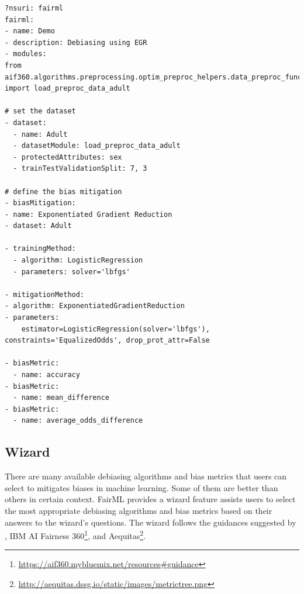 \documentclass[sigconf,review]{acmart}
\begin{document}
\begin{lstlisting}[firstnumber=1,style=yaml,caption={Bias mitigation using  Demo Exponentiated Gradient Reduction  expressed in YAML.},label=lst:fairml_model]
?nsuri: fairml
fairml:
- name: Demo
- description: Debiasing using EGR
- modules: 
from aif360.algorithms.preprocessing.optim_preproc_helpers.data_preproc_functions import load_preproc_data_adult

# set the dataset
- dataset:
  - name: Adult
  - datasetModule: load_preproc_data_adult
  - protectedAttributes: sex
  - trainTestValidationSplit: 7, 3

# define the bias mitigation
- biasMitigation:
- name: Exponentiated Gradient Reduction  
- dataset: Adult

- trainingMethod:
  - algorithm: LogisticRegression
  - parameters: solver='lbfgs'

- mitigationMethod:
- algorithm: ExponentiatedGradientReduction
- parameters: 
    estimator=LogisticRegression(solver='lbfgs'), constraints='EqualizedOdds', drop_prot_attr=False

- biasMetric:
  - name: accuracy
- biasMetric:
  - name: mean_difference
- biasMetric:
  - name: average_odds_difference
\end{lstlisting}


\subsection{Wizard}
\label{sec:wizard}
There are many available debiasing algorithms and bias metrics that users can select to mitigates biases in machine learning. Some of them are better than others in certain context. FairML provides a wizard feature assists users to select the most appropriate debiasing algorithms and bias metrics based on their answers to the wizard's questions. The wizard follows the guidances suggested by \cite{mahoney2020ai}, IBM AI Fairness 360\footnote{\url{https://aif360.mybluemix.net/resources\#guidance}}, and Aequitas\footnote{\url{http://aequitas.dssg.io/static/images/metrictree.png}}.
\end{document}
